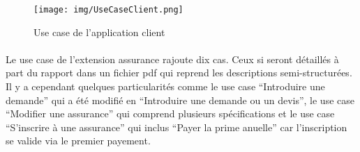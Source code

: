 \documentclass[]{article}
\begin{document}
    \begin{figure}[ht]
        \centering
        \texttt{[image: img/UseCaseClient.png]}
        \caption{Use case de l'application client}
        \label{fig1}
        \end{figure}

    \paragraph{}Le use case de l’extension assurance rajoute dix cas. Ceux si seront détaillés à part du rapport dans un fichier pdf qui reprend les descriptions semi-structurées. Il y a cependant quelques particularités comme le use case “Introduire une demande” qui a été modifié en “Introduire une demande ou un devis”, le use case “Modifier une assurance” qui comprend plusieurs spécifications et le use case “S’inscrire à une assurance” qui inclus “Payer la prime anuelle” car l’inscription se valide via le premier payement.
\end{document}
